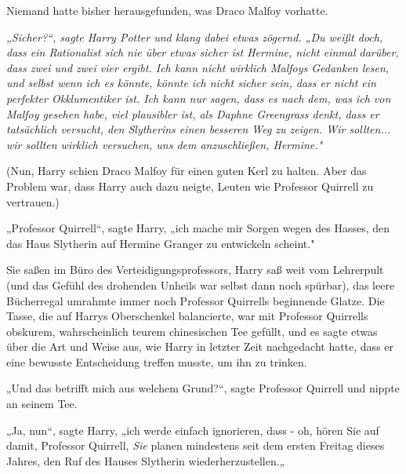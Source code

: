 {Niemand hatte bisher herausgefunden, was Draco Malfoy vorhatte.

\emph{\emph{„Sicher?“, sagte Harry Potter und klang dabei etwas zögernd. „Du weißt doch, dass ein Rationalist sich nie über etwas sicher ist Hermine, nicht einmal darüber, dass zwei und zwei vier ergibt. Ich kann nicht wirklich Malfoys Gedanken lesen, und selbst wenn ich es könnte, könnte ich nicht sicher sein, dass er nicht ein perfekter Okklumentiker ist. Ich kann nur sagen, dass es nach dem, was ich von Malfoy gesehen habe, viel plausibler ist, als Daphne Greengrass denkt, dass er tatsächlich versucht, den Slytherins einen besseren Weg zu zeigen. Wir sollten... wir sollten wirklich versuchen, uns dem anzuschließen, Hermine."}}

(Nun, Harry schien Draco Malfoy für einen guten Kerl zu halten. Aber das Problem war, dass Harry auch dazu neigte, Leuten wie Professor Quirrell zu vertrauen.)

„Professor Quirrell“, sagte Harry, „ich mache mir Sorgen wegen des Hasses, den das Haus Slytherin auf Hermine Granger zu entwickeln scheint."

Sie saßen im Büro des Verteidigungsprofessors, Harry saß weit vom Lehrerpult (und das Gefühl des drohenden Unheils war selbst dann noch spürbar), das leere Bücherregal umrahmte immer noch Professor Quirrells beginnende Glatze. Die Tasse, die auf Harrys Oberschenkel balancierte, war mit Professor Quirrells obskurem, wahrscheinlich teurem chinesischen Tee gefüllt, und es sagte etwas über die Art und Weise aus, wie Harry in letzter Zeit nachgedacht hatte, dass er eine bewusste Entscheidung treffen musste, um ihn zu trinken.

„Und das betrifft mich aus welchem Grund?“, sagte Professor Quirrell und nippte an seinem Tee.

„Ja, nun“, sagte Harry, „ich werde einfach ignorieren, dass - oh, hören Sie auf damit, Professor Quirrell, \emph{Sie} planen mindestens seit dem ersten Freitag dieses Jahres, den Ruf des Hauses Slytherin wiederherzustellen.„

}
